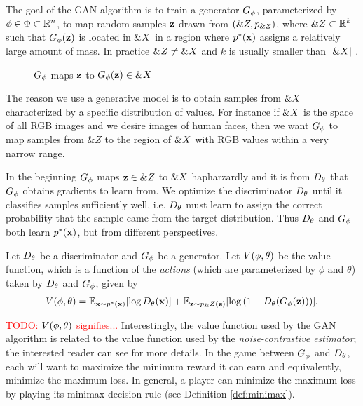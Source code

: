 The goal of the GAN algorithm is to train a generator $G_\phi$,
parameterized by $\phi \in \Phi \subset \mathbb{R}^n$, to map random samples
$\mathbf{z}$ drawn from $(\&Z, p_{\&Z})$, where $\&Z \subset \mathbb{R}^k$
such that $G_\phi(\mathbf{z})$ is located in $\&X$ in a region where $p^*(\mathbf{x})$
assigns a relatively large amount of mass. In practice
$\&Z \not = \&X$ and $k$ is usually smaller than $|\&X|$
\cite{ref:arjovsky-2017}.

\begin{figure}[H] \centering
  \caption{$G_\phi$ maps $\mathbf{z}$ to $G_\phi(\mathbf{z}) \in \&X$}
  \label{fig:g-maps}
\end{figure}

The reason we use a generative model is to obtain samples from
$\&X$ characterized by a specific distribution of values. For
instance if $\&X$ is the space of all RGB images and we desire
images of human faces, then we want $G_\phi$ to map samples from $\&Z$ to
the region of $\&X$ with RGB values within a very narrow range.

In the beginning $G_\phi$ maps $\mathbf{z} \in \&Z$ to $\&X$ hapharzardly and
it is from $D_\theta$ that $G_\phi$ obtains gradients to learn from. We optimize
the discriminator $D_\theta$ until it classifies samples sufficiently well,
i.e. $D_\theta$ must learn to assign the correct probability that the sample
came from the target distribution. Thus $D_\theta$ and $G_\phi$ both learn
$p^*(\mathbf{x})$, but from different perspectives.

Let $D_\theta$ be a discriminator and $G_\phi$ be a generator. Let $V(\phi, \theta)$ be the
value function, which is a function of the \textit{actions} (which are
parameterized by $\phi$ and $\theta$) taken by $D_\theta$ and $G_\phi$, given by
\begin{align}
  \label{eq:the-original-objective-function} V(\phi, \theta) =
  \mathbb{E}_{\mathbf{x} \sim p^*(\mathbf{x})}[{\log D_\theta(\mathbf{x}})] + \mathbb{E}_{\mathbf{z} \sim
  p_\&Z(\mathbf{z})}[\log{(1 - D_\theta(G_\phi(\mathbf{z})))}].
\end{align}

\textcolor{red}{TODO: $V(\phi, \theta)$ signifies...} Interestingly, the value
function used by the GAN algorithm is related to the value function
used by the \textit{noise-contrastive estimator}; the interested
reader can see \cite{ref:gutmann-2010} for more details. In the game
between $G_\phi$ and $D_\theta$, each will want to maximize the minimum reward
it can earn and equivalently, minimize the maximum loss. In general, a
player can minimize the maximum loss by playing its minimax decision
rule (see Definition \ref{def:minimax}).

